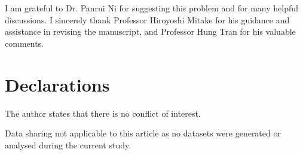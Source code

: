 \documentclass[preprint]{elsarticle}
\numberwithin{equation}{section}
\begin{document}
I am grateful to Dr. Panrui Ni for suggesting this problem and for many helpful discussions. I sincerely thank Professor Hiroyoshi Mitake for his guidance and assistance in revising the manuscript, and Professor Hung Tran for his valuable comments.

\section*{Declarations}

 The author states that there is no conflict of interest.

\medskip

 Data sharing not applicable to this article as no datasets were generated or analysed during the current study.


\end{document}
